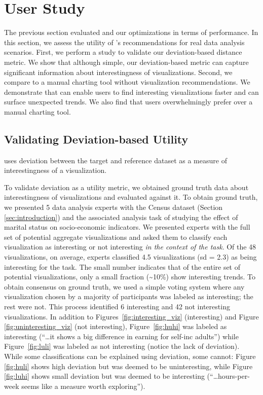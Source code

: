 
\section{User Study}
\label{sec:user_study}

The previous section evaluated \SeeDB 
and our optimizations in terms of performance.
In this section, we assess the utility of \SeeDB's recommendations 
for real data analysis scenarios.
First, we perform a study to validate our deviation-based distance metric.
We show that although simple, our deviation-based
metric can capture significant information about interestingness of visualizations.
Second, we compare \SeeDB
to a manual charting tool without visualization recommendations.
We demonstrate that \SeeDB can enable users to find interesting visualizations
faster and can surface unexpected trends.
We also find that users overwhelmingly prefer \SeeDB over a manual charting 
tool.

\subsection{Validating Deviation-based Utility}
\label{sec:validating_metric}

\SeeDB uses deviation between the target and reference dataset as a measure
of interestingness of a visualization.

To validate deviation as a utility metric, we obtained ground truth data about
interestingness of visualizations and evaluated \SeeDB against it.
To obtain ground truth, we presented 5 data analysis experts with the Census 
dataset (Section \ref{sec:introduction}) and the associated analysis task of
studying the effect of marital status on socio-economic indicators.
We presented experts with the full set of potential aggregate visualizations 
and asked them to classify each visualization as interesting or
not interesting {\em in the context of the task}.
Of the 48 visualizations, on average, experts classified 4.5 visualizations
(sd = 2.3) as being interesting for the task.
The small number indicates that of the entire set of potential visualizations, 
only a small fraction (\textasciitilde10\%) show interesting trends.
To obtain consensus on ground truth, we used a simple voting system where
any visualization chosen by a majority of participants was labeled as 
interesting; the rest were not. 
This process identified 6 interesting and 42 not interesting visualizations.
In addition to Figures~\ref{fig:interesting_viz} (interesting) and Figure 
\ref{fig:uninteresting_viz} (not interesting), Figure~\ref{fig:huhi} 
was labeled as interesting (``\ldots it
shows a big difference in earning for self-inc adults'') while 
Figure~\ref{fig:luli} was labeled as not interesting (notice the lack of deviation).
While some classifications can be explained using deviation, some cannot: 
Figure \ref{fig:huli} shows high deviation but was deemed to be uninteresting, 
while Figure \ref{fig:luhi} shows small 
deviation but was deemed to be interesting (``\ldots hours-per-week seems like a 
measure worth exploring''). 

